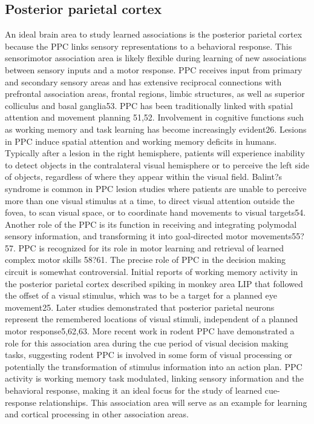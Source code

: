 \subsection{Posterior parietal cortex}\label{methods:ppc}
An ideal brain area to study learned associations is the posterior parietal cortex because the PPC links sensory representations to a behavioral response. This sensorimotor association area is likely flexible during learning of new associations between sensory inputs and a motor response. PPC receives input from primary and secondary sensory areas and has extensive reciprocal connections with prefrontal association areas, frontal regions, limbic structures, as well as superior colliculus and basal ganglia53. PPC has been traditionally linked with spatial attention and movement planning 51,52. Involvement in cognitive functions such as working memory and task learning has become increasingly evident26. Lesions in PPC induce spatial attention and working memory deficits in humans. Typically after a lesion in the right hemisphere, patients will experience inability to detect objects in the contralateral visual hemisphere or to perceive the left side of objects, regardless of where they appear within the visual field. Balint?s syndrome is common in PPC lesion studies where patients are unable to perceive more than one visual stimulus at a time, to direct visual attention outside the fovea, to scan visual space, or to coordinate hand movements to visual targets54. Another role of the PPC is its function in receiving and integrating polymodal sensory information, and transforming it into goal-directed motor movements55?57. PPC is recognized for its role in motor learning and retrieval of learned complex motor skills 58?61. The precise role of PPC in the decision making circuit is somewhat controversial. Initial reports of working memory activity in the posterior parietal cortex described spiking in monkey area LIP that followed the offset of a visual stimulus, which was to be a target for a planned eye movement25. Later studies demonstrated that posterior parietal neurons represent the remembered locations of visual stimuli, independent of a planned motor response5,62,63. More recent work in rodent PPC have demonstrated a role for this association area during the cue period of visual decision making tasks, suggesting rodent PPC is involved in some form of visual processing or potentially the transformation of stimulus information into an action plan. PPC activity is working memory task modulated, linking sensory information and the behavioral response, making it an ideal focus for the study of learned cue-response relationships. This association area will serve as an example for learning and cortical processing in other association areas.

